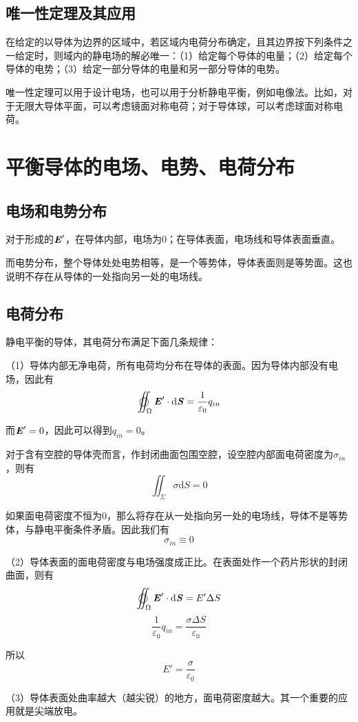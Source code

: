 \documentclass[UTF8,openany]{book}
\begin{document}
	\subsection{唯一性定理及其应用}
	\par 在给定的以导体为边界的区域中，若区域内电荷分布确定，且其边界按下列条件之一给定时，则域内的静电场的解必唯一：（1）给定每个导体的电量；（2）给定每个导体的电势；（3）给定一部分导体的电量和另一部分导体的电势。
	\par 唯一性定理可以用于设计电场，也可以用于分析静电平衡，例如电像法。比如，对于无限大导体平面，可以考虑镜面对称电荷；对于导体球，可以考虑球面对称电荷。
	\section{平衡导体的电场、电势、电荷分布}
	\subsection{电场和电势分布}
	\par 对于形成的$\textbf{\textit{E}}'$，在导体内部，电场为0；在导体表面，电场线和导体表面垂直。
	\par 而电势分布，整个导体处处电势相等，是一个等势体，导体表面则是等势面。这也说明不存在从导体的一处指向另一处的电场线。
	\subsection{电荷分布}
	\par 静电平衡的导体，其电荷分布满足下面几条规律：
	\par （1）导体内部无净电荷，所有电荷均分布在导体的表面。因为导体内部没有电场，因此有
	$$\varoiint_{\Omega}\textbf{\textit{E}}'\cdot\mathrm{d}\textbf{\textit{S}}=\frac{1}{\varepsilon_0}q_{in}$$
	\par 而$\textbf{\textit{E}}'=0$，因此可以得到$q_{in}=0$。
	\par 对于含有空腔的导体壳而言，作封闭曲面包围空腔，设空腔内部面电荷密度为$\sigma_{in}$，则有
	$$\iint_{\Sigma}\sigma\mathrm{d}S=0$$
	\par 如果面电荷密度不恒为0，那么将存在从一处指向另一处的电场线，导体不是等势体，与静电平衡条件矛盾。因此我们有
	$$\sigma_{in}\equiv0$$
	\par （2）导体表面的面电荷密度与电场强度成正比。在表面处作一个药片形状的封闭曲面，则有
	$$\varoiint_{\Omega}\textbf{\textit{E}}'\cdot\mathrm{d}\textbf{\textit{S}}=E'\Delta S$$
	$$\frac{1}{\varepsilon_0}q_{in}=\frac{\sigma\Delta S}{\varepsilon_0}$$
	\par 所以
	$$E'=\frac{\sigma}{\varepsilon_{0}}$$
	\par （3）导体表面处曲率越大（越尖锐）的地方，面电荷密度越大。其一个重要的应用就是尖端放电。
\end{document}
